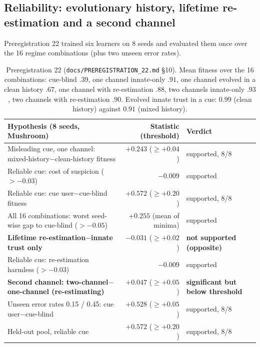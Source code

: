 \documentclass[11pt]{article}
\begin{document}
\subsection{Reliability: evolutionary history, lifetime re-estimation and a second channel}
Preregistration 22 trained six learners on 8 seeds and evaluated them once over the 16 regime combinations (plus two unseen error rates).
\begin{table}[h]\centering\small
\begin{tabular}{@{}p{6.3cm}rl@{}}\toprule
Hypothesis (8 seeds, Mushroom) & Statistic (threshold) & Verdict\\\midrule
Misleading cue, one channel: mixed-history$-$clean-history fitness & $+0.243$ ($\ge+0.04$) & supported, 8/8\\
Reliable cue: cost of suspicion ($>-0.03$) & $-0.009$ & supported\\
Reliable cue: cue user$-$cue-blind fitness & $+0.572$ ($\ge+0.20$) & supported, 8/8\\
All 16 combinations: worst seed-wise gap to cue-blind ($>-0.05$) & $+0.255$ (mean of minima) & supported\\
\textbf{Lifetime re-estimation$-$innate trust only} & $-0.031$ ($\ge+0.02$) & \textbf{not supported (opposite)}\\
Reliable cue: re-estimation harmless ($>-0.03$) & $-0.009$ & supported\\
\textbf{Second channel: two-channel$-$one-channel (re-estimating)} & $+0.047$ ($\ge+0.05$) & \textbf{significant but below threshold}\\
Unseen error rates 0.15 / 0.45: cue user$-$cue-blind & $+0.528$ ($\ge+0.05$) & supported, 8/8\\
Held-out pool, reliable cue & $+0.572$ ($\ge+0.20$) & supported, 8/8\\\bottomrule
\end{tabular}
\caption{\label{tab:reliability}Preregistration 22 (\texttt{docs/PREREGISTRATION\_22.md} \S10). Mean fitness over the 16 combinations: cue-blind $.39$, one channel innate-only $.91$, one channel evolved in a clean history $.67$, one channel with re-estimation $.88$, two channels innate-only $.93$, two channels with re-estimation $.90$. Evolved innate trust in a cue: $0.99$ (clean history) against $0.91$ (mixed history).}
\end{table}
\end{document}
